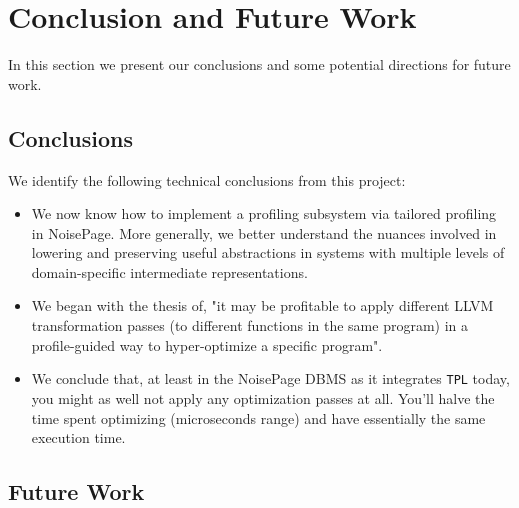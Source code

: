 \documentclass{vldb}
\newcommand{\tpl}{\texttt{TPL}\xspace}
\begin{document}
\section{Conclusion and Future Work}

In this section we present our conclusions and some potential directions for future work.

\subsection{Conclusions}

We identify the following technical conclusions from this project:
\begin{itemize}
    \item We now know how to implement a profiling subsystem via tailored profiling in NoisePage. More generally, we better understand the nuances involved in lowering and preserving useful abstractions in systems with multiple levels of domain-specific intermediate representations.
    \item We began with the thesis of, "it may be profitable to apply different LLVM transformation passes (to different functions in the same program) in a profile-guided way to hyper-optimize a specific program".
    \item We conclude that, at least in the NoisePage DBMS as it integrates \tpl today, you might as well not apply any optimization passes at all. You'll halve the time spent optimizing (microseconds range) and have essentially the same execution time.
\end{itemize}

\subsection{Future Work}
\end{document}
